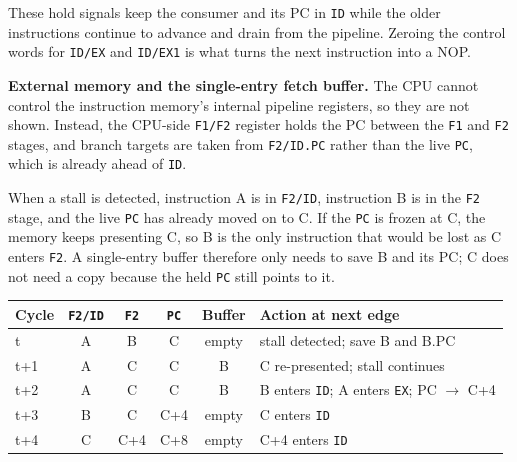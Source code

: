 \documentclass[11pt, a4paper]{article}
\begin{document}
These hold signals keep the consumer and its PC in \texttt{ID} while the older instructions continue to advance and drain from the pipeline. Zeroing the control words for \texttt{ID/EX} and \texttt{ID/EX1} is what turns the next instruction into a NOP.

\textbf{External memory and the single-entry fetch buffer.} The CPU cannot control the instruction memory's internal pipeline registers, so they are not shown. Instead, the CPU-side \texttt{F1/F2} register holds the PC between the \texttt{F1} and \texttt{F2} stages, and branch targets are taken from \texttt{F2/ID.PC} rather than the live \texttt{PC}, which is already ahead of \texttt{ID}.

When a stall is detected, instruction A is in \texttt{F2/ID}, instruction B is in the \texttt{F2} stage, and the live \texttt{PC} has already moved on to C. If the \texttt{PC} is frozen at C, the memory keeps presenting C, so B is the only instruction that would be lost as C enters \texttt{F2}. A single-entry buffer therefore only needs to save B and its PC; C does not need a copy because the held \texttt{PC} still points to it.

\begin{center}
\footnotesize
\setlength{\tabcolsep}{4pt}
\begin{tabular}{@{}lcccc >{\raggedright\arraybackslash}p{5.4cm}@{}}
\toprule
\textbf{Cycle} & \texttt{F2/ID} & \texttt{F2} & \texttt{PC} & \textbf{Buffer} & \textbf{Action at next edge} \\
\midrule
t   & A & B & C & empty & stall detected; save B and B.PC \\
t+1 & A & C & C & B & C re-presented; stall continues \\
t+2 & A & C & C & B & B enters \texttt{ID}; A enters \texttt{EX}; PC $\rightarrow$ C+4 \\
t+3 & B & C & C+4 & empty & C enters \texttt{ID} \\
t+4 & C & C+4 & C+8 & empty & C+4 enters \texttt{ID} \\
\bottomrule
\end{tabular}
\end{center}
\end{document}
